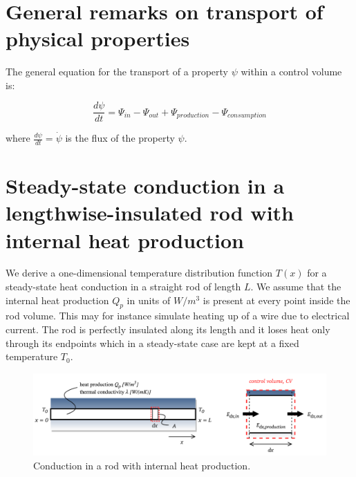 \documentclass[10pt]{article}
\begin{document}
\newpage

\tableofcontents

\newpage

\setlength{\parskip}{0.6em}
\setlength{\parindent}{0cm}


\,\,\,

\normalsize

\section{General remarks on transport of physical properties}

The general equation for the transport of a property $\psi$ within a control volume is:

\begin{equation}
\frac{d \psi}{dt} = \Psi_{in} - \Psi_{out} + \Psi_{production} - \Psi_{consumption}
\end{equation}

where $\frac{d \psi}{dt} = \dot{\psi}$ is the flux of the property $\psi$.

\newpage

\section{Steady-state conduction in a lengthwise-insulated rod with internal heat production}

We derive a one-dimensional temperature distribution function $T(x)$ for a steady-state heat conduction in a straight rod of length $L$. We assume that the internal heat production $Q_p$ in units of $W/m^3$ is present at every point inside the rod volume. This may for instance simulate heating up of a wire due to electrical current. The rod is perfectly insulated along its length and it loses heat only through its endpoints which in a steady-state case are kept at a fixed temperature $T_0$.

\begin{figure}[H]
\centering\includegraphics[width=16cm]{plots/cond-rod.png}
\caption{Conduction in a rod with internal heat production.}
\label{fig:conduction}
\end{figure}
\end{document}
